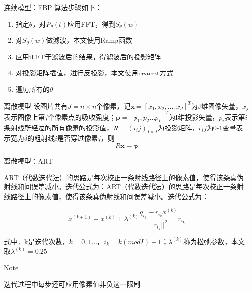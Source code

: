 \documentclass{beamer}
\begin{document}
  
  
\begin{frame}{连续模型：FBP} 
	算法步骤如下：  
	\begin{enumerate}
		\item 指定$\theta$，对\(P_\theta (t)\)应用FFT，得到\(S_\theta (w)\)
		        
		\item 对\(S_\theta (w)\)做滤波，本文使用Ramp函数
		        
		\item 应用iFFT于滤波后的结果，得滤波后的投影矩阵
		        
		\item 对投影矩阵插值，进行反投影，本文使用nearest方式
		        
		\item 遍历所有的$\theta$    
	\end{enumerate}
\end{frame}
  
  
\begin{frame}{离散模型}  
	设图片共有\(J = n\times n\)个像素，记$\textbf{x}=[x_{1},x_{2} ,\ldots ,x_{J}]^T$为J维图像矢量，\(x_j\)表示图像上第\(j\)个像素点的吸收强度；$\textbf{p}=[p_{1},p_{2} \ldots p_{I}]^T$为I维投影矢量，$p_i$表示第\(i\)条射线所经过的所有像素的投影值，$R=(r_ij)_{I\times J}$为投影矩阵，\(r_ij\)为0-1变量表示宽为\(\delta\)的粗射线\(i\)是否穿过像素\(j\)，则	  
	\begin{equation}
		R\textbf{x}=\textbf{p}
	\end{equation}
\end{frame}
  
  
  
\begin{frame}{离散模型：ART}
	  
	ART（代数迭代法）的思路是每次校正一条射线路径上的像素值，使得该条真伪射线和间误差减小。迭代公式为：ART（代数迭代法）的思路是每次校正一条射线路径上的像素值，使得该条真伪射线和间误差减小。迭代公式为：
	  
	\begin{equation}
		x^{(k+1)}=x^{(k)}+\lambda^{(k)}\frac{q_{i_{k}}-r_{i_{k}}x^{(k)}}{||r_{i_{k}}||^{2}}r_{i_{k}}
	\end{equation}
	  
	式中，k是迭代次数，$k=0,1 \ldots$，$i_{k}=k(modI)+1$；$\lambda^{(k)}$称为松弛参数，本文取$\lambda^{(k)}=0.25$
	  
	\begin{alertblock}{Note}
		  
		迭代过程中每步还可应用像素值非负这一限制
		  
	\end{alertblock}
	  
\end{frame}
  
\end{document}
